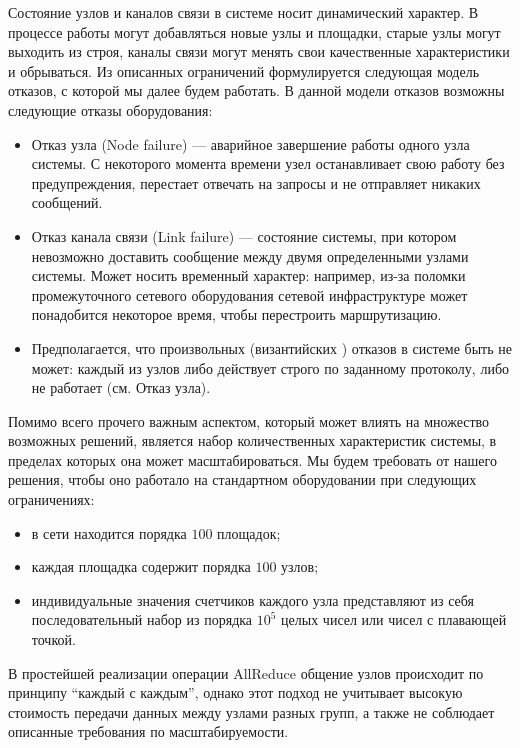 Состояние узлов и каналов связи в системе носит динамический характер. В процессе работы могут добавляться новые узлы и площадки, старые узлы могут выходить из строя, каналы связи могут менять свои качественные характеристики и обрываться. Из описанных ограничений формулируется следующая модель отказов, с которой мы далее будем работать. В данной модели отказов возможны следующие отказы оборудования:

\begin{itemize}
    \item Отказ узла (Node failure) — аварийное завершение работы одного узла системы. С некоторого момента времени узел останавливает свою работу без предупреждения, перестает отвечать на запросы и не отправляет никаких сообщений.
    
    \item Отказ канала связи (Link failure) — состояние системы, при котором невозможно доставить сообщение между двумя определенными узлами системы. Может носить временный характер: например, из-за поломки промежуточного сетевого оборудования сетевой инфраструктуре может понадобится некоторое время, чтобы перестроить маршрутизацию.
    
    \item Предполагается, что произвольных (византийских \cite{lamport1982byzantine}) отказов в системе быть не может: каждый из узлов либо действует строго по заданному протоколу, либо не работает (см. Отказ узла).
\end{itemize}

Помимо всего прочего важным аспектом, который может влиять на множество возможных решений, является набор количественных характеристик системы, в пределах которых она может масштабироваться. Мы будем требовать от нашего решения, чтобы оно работало на стандартном оборудовании при следующих ограничениях:

\begin{itemize}
    \item в сети находится порядка $100$ площадок;
    \item каждая площадка содержит порядка $100$ узлов;
    \item индивидуальные значения счетчиков каждого узла представляют из себя последовательный набор из порядка $10^5$ целых чисел или чисел с плавающей точкой.
\end{itemize}

В простейшей реализации операции AllReduce общение узлов происходит по принципу \enquote{каждый с каждым}, однако этот подход не учитывает высокую стоимость передачи данных между узлами разных групп, а также не соблюдает описанные требования по масштабируемости.

